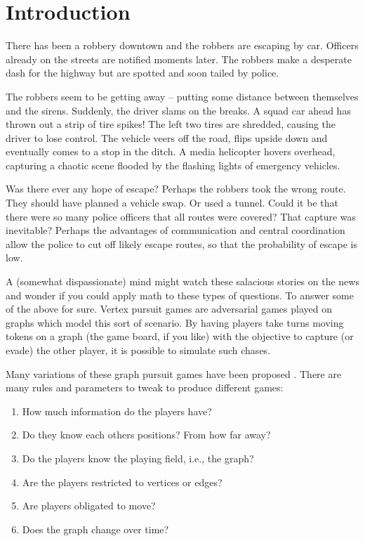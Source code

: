 \chapter{Introduction}\label{chapter intro}

There has been a robbery downtown and the robbers are escaping by car. Officers
already on the streets are notified moments later. The robbers make a desperate dash for the highway but are spotted and soon tailed by police.

The robbers seem to be getting away -- putting some distance between themselves and the sirens.
Suddenly, the driver slams on the breaks. A squad car ahead has thrown out a strip of tire spikes! The left two tires are shredded, causing the driver to lose control. The vehicle veers off the road, flips upside down and eventually comes to a stop in the ditch. A media helicopter hovers overhead, capturing
a chaotic scene flooded by the flashing lights of emergency vehicles.

Was there ever any hope of escape? Perhaps the robbers took the wrong route.
They should have planned a vehicle swap. Or used a tunnel. Could it be that there were
so many police officers that all routes were covered? That capture was inevitable?
Perhaps the advantages of communication and central coordination allow the police to
  cut off likely escape routes, so that the probability of escape is low.

A (somewhat dispassionate) mind might watch these salacious stories on the news and wonder
 if you could apply math to these types of questions. To answer some of the above for sure.
Vertex pursuit games are adversarial games played on graphs which model this sort
of scenario.
By having players take turns moving tokens on a graph (the game board, if you like) with
the objective to capture (or evade) the other player, it is possible to simulate such chases.

Many variations of these graph pursuit games have been proposed \cite{bonato2017graph, bellman1967graphs}. There are many rules and
parameters to tweak to produce different games:

\begin{enumerate}
\item How much information do the players have?
\item Do they know each others positions? From how far away?
\item Do the players know the playing field, i.e., the graph?
\item Are the players restricted to vertices or edges?
\item Are players obligated to move?
\item Does the graph change over time?
\end{enumerate}

